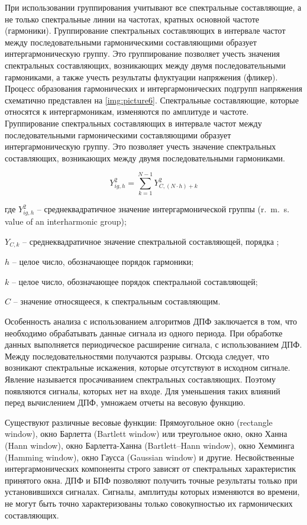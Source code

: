 При использовании группирования учитывают все спектральные составляющие, а не только спектральные линии на частотах, кратных основной частоте (гармоники). Группирование спектральных составляющих в интервале частот между последовательными гармоническими составляющими образует интергармоническую группу. Это группирование позволяет учесть значения спектральных составляющих, возникающих между двумя последовательными гармониками, а также учесть результаты флуктуации напряжения (фликер). Процесс образования гармонических и интергармонических подгрупп напряжения схематично представлен на \ref{img:picture6}.
Спектральные составляющие, которые относятся к интергармоникам, изменяются по амплитуде и частоте. Группирование спектральных составляющих в интервале частот между последовательными гармоническими составляющими образует интергармоническую группу. Это позволяет учесть значение спектральных составляющих, возникающих между двумя последовательными гармониками.

\begin{equation}
	\label{eq:equation1}
	Y_{ig,h}^2 = \displaystyle\sum_{k=1}^{N-1} Y_{C,(N \cdot h)+k}^2 
\end{equation}  

где $Y_{ig,h}^2$ – среднеквадратичное значение интергармонической группы (r.~m.~s. value of an interharmonic group);

$Y_{C,k}$ – среднеквадратичное значение спектральной составляющей, порядка  ;

$h$ – целое число, обозначающее порядок гармоники;

$k$ – целое число, обозначающее порядок спектральной составляющей;

$C$ – значение относящееся, к спектральным составляющим. 

Особенность анализа с использованием алгоритмов ДПФ заключается в том, что необходимо обрабатывать данные сигнала из одного периода. При обработке данных выполняется периодическое расширение сигнала, с использованием ДПФ. Между последовательностями получаются разрывы. Отсюда следует, что возникают спектральные искажения, которые отсутствуют в исходном сигнале. Явление называется просачиванием спектральных составляющих. Поэтому появляются сигналы, которых нет на входе. Для уменьшения таких влияний перед вычислением ДПФ, умножаем отчеты на весовую функцию. 

Существуют различные весовые функции: Прямоугольное окно (rectangle window), окно Барлетта (Bartlett window) или треугольное окно, окно Ханна (Hann window), окно Барлетта-Ханна (Bartlett–Hann window), окно Хемминга (Hamming window), окно Гаусса (Gaussian window) и другие. Несвойственные интергармонических компоненты строго зависят от спектральных характеристик принятого окна. 
ДПФ и БПФ позволяют получить точные результаты только при установившихся сигналах. Сигналы, амплитуды которых изменяются во времени, не могут быть точно характеризованы только совокупностью их гармонических составляющих.

